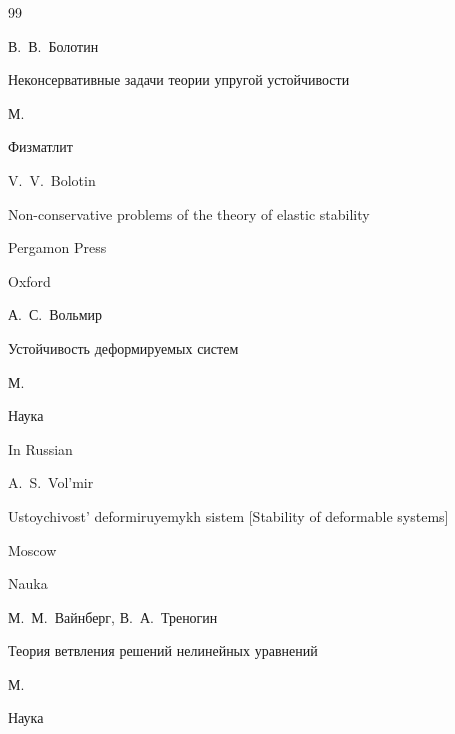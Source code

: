 \begin{thebibliography}{99}






\by В.~В.~Болотин

\book Неконсервативные задачи теории упругой устойчивости

\publaddr М.

\publ Физматлит



\transl

\by V.~V.~Bolotin

\book Non-conservative problems of the theory of elastic stability 

\publ Pergamon Press

\publaddr Oxford






\by А.~С.~Вольмир

\book Устойчивость деформируемых систем

\publaddr М.

\publ Наука



\misctransl

\lang In Russian

\by A.~S.~Vol'mir

\book Ustoychivost' deformiruyemykh sistem \rm [Stability of deformable systems]

\publaddr Moscow

\publ Nauka










\by М.~М.~Вайнберг, В.~А.~Треногин

\book Теория ветвления решений нелинейных уравнений

\publaddr М.

\publ Наука




\end{thebibliography}
